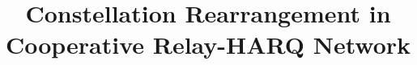 \documentclass[conference]{IEEEtran}
\begin{document}
%
\title{Constellation Rearrangement in Cooperative Relay-HARQ Network}


\author{
}


% 
\end{document}
